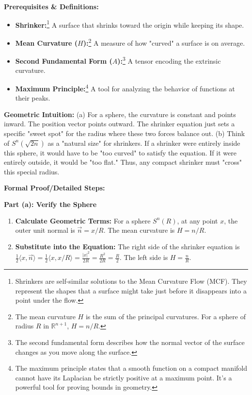 \begin{solution}
\textbf{Prerequisites \& Definitions:}
\begin{itemize}
    \item \textbf{Shrinker:}\footnote{Shrinkers are self-similar solutions to the Mean Curvature Flow (MCF). They represent the shapes that a surface might take just before it disappears into a point under the flow.} A surface that shrinks toward the origin while keeping its shape.
    \item \textbf{Mean Curvature ($H$):}\footnote{The mean curvature $H$ is the sum of the principal curvatures. For a sphere of radius $R$ in $\mathbb{R}^{n+1}$, $H = n/R$.} A measure of how "curved" a surface is on average.
    \item \textbf{Second Fundamental Form ($A$):}\footnote{The second fundamental form describes how the normal vector of the surface changes as you move along the surface.} A tensor encoding the extrinsic curvature.
    \item \textbf{Maximum Principle:}\footnote{The maximum principle states that a smooth function on a compact manifold cannot have its Laplacian be strictly positive at a maximum point. It's a powerful tool for proving bounds in geometry.} A tool for analyzing the behavior of functions at their peaks.
\end{itemize}

\textbf{Geometric Intuition:}
(a) For a sphere, the curvature is constant and points inward. The position vector points outward. The shrinker equation just sets a specific "sweet spot" for the radius where these two forces balance out.
(b) Think of $S^n(\sqrt{2n})$ as a "natural size" for shrinkers. If a shrinker were entirely inside this sphere, it would have to be "too curved" to satisfy the equation. If it were entirely outside, it would be "too flat." Thus, any compact shrinker must "cross" this special radius.

\textbf{Formal Proof/Detailed Steps:}

\textbf{Part (a): Verify the Sphere}
\begin{enumerate}
    \item \textbf{Calculate Geometric Terms:}
    For a sphere $S^n(R)$, at any point $x$, the outer unit normal is $\vec{n} = x/R$.
    The mean curvature is $H = n/R$.
    
    \item \textbf{Substitute into the Equation:}
    The right side of the shrinker equation is $\frac{1}{2} \langle x, \vec{n} \rangle = \frac{1}{2} \langle x, x/R \rangle = \frac{|x|^2}{2R} = \frac{R^2}{2R} = \frac{R}{2}$.
    The left side is $H = \frac{n}{R}$.
    

\end{enumerate}
\end{solution}
